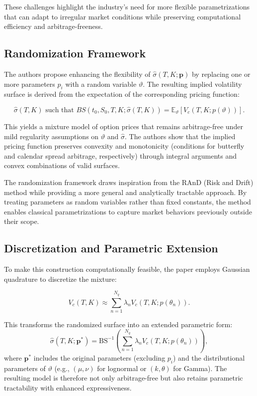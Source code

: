 These challenges highlight the industry's need for more flexible parametrizations that can adapt to irregular market conditions while preserving computational efficiency and arbitrage-freeness.

\subsection{Randomization Framework}

The authors propose enhancing the flexibility of $\hat{\sigma}(T,K; \mathbf{p})$ by replacing one or more parameters $p_i$ with a random variable $\vartheta$. The resulting implied volatility surface is derived from the expectation of the corresponding pricing function:

\[
    \hat{\sigma}(T,K) \text{ such that } BS(t_0, S_0, T, K; \hat{\sigma}(T,K)) = \mathbb{E}_{\vartheta}[V_c(T,K; p(\vartheta))].
\]

This yields a mixture model of option prices that remains arbitrage-free under mild regularity assumptions on $\vartheta$ and $\hat{\sigma}$. The authors show that the implied pricing function preserves convexity and monotonicity (conditions for butterfly and calendar spread arbitrage, respectively) through integral arguments and convex combinations of valid surfaces.

The randomization framework draws inspiration from the RAnD (Risk and Drift) method while providing a more general and analytically tractable approach. By treating parameters as random variables rather than fixed constants, the method enables classical parametrizations to capture market behaviors previously outside their scope.

\subsection{Discretization and Parametric Extension}

To make this construction computationally feasible, the paper employs Gaussian quadrature to discretize the mixture:

\[
    V_c(T,K) \approx \sum_{n=1}^{N_q} \lambda_n V_c(T,K; p(\theta_n)).
\]

This transforms the randomized surface into an extended parametric form:
\[
    \hat{\sigma}(T,K; \mathbf{p}^*) = \text{BS}^{-1}\left(\sum_{n=1}^{N_q} \lambda_n V_c(T,K; p(\theta_n))\right),
\]
where $\mathbf{p}^*$ includes the original parameters (excluding $p_i$) and the distributional parameters of $\vartheta$ (e.g., $(\mu, \nu)$ for lognormal or $(k, \theta)$ for Gamma). The resulting model is therefore not only arbitrage-free but also retains parametric tractability with enhanced expressiveness.


